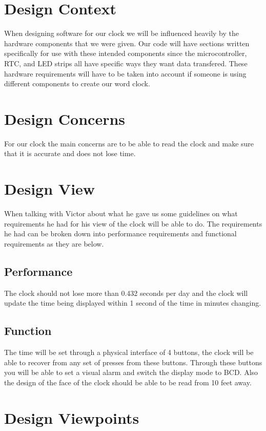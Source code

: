 \documentclass[10pt,draftclsnofoot,onecolumn]{IEEEtran}
\begin{document}
\newpage

\section{Design Context}
When designing software for our clock we will be influenced heavily by the hardware components that we were given. Our code will have sections written specifically for use with these intended components since the microcontroller, RTC, and LED strips all have specific ways they want data transfered. These hardware requirements will have to be taken into account if someone is using different components to create our word clock. 

\section{Design Concerns}
For our clock the main concerns are to be able to read the clock and make sure that it is accurate and does not lose time. 

\section{Design View}
When talking with Victor about what he gave us some guidelines on what requirements he had for his view of the clock will be able to do. The requirements he had can be broken down into performance requirements and functional requirements as they are below. 

\subsection{Performance}
The clock should not lose more than 0.432 seconds per day and the clock will update the time being displayed within 1 second of the time in minutes changing. 

\subsection{Function}
The time will be set through a physical interface of 4 buttons, the clock will be able to recover from any set of presses from these buttons. Through these buttons you will be able to set a visual alarm and switch the display mode to BCD. Also the design of the face of the clock should be able to be read from 10 feet away. 

\section{Design Viewpoints}
\end{document}
